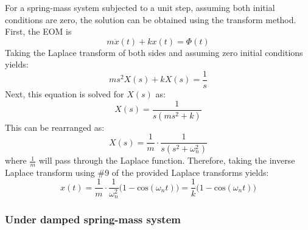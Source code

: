 \documentclass[12pt,letter]{article}
\numberwithin{ex}{section} %
\numberwithin{re}{section} %
\begin{document}
For a spring-mass system subjected to a unit step, assuming both initial conditions are zero, the solution can be obtained using the transform method. First, the EOM is 
\begin{equation}
m\ddot{x}(t) + kx(t) = \Phi(t)
\end{equation}
Taking the Laplace transform of both sides and assuming zero initial conditions yields:
\begin{equation}
	ms^2X(s)+kX(s) =\frac{1}{s}
\end{equation}
Next, this equation is solved for $X(s)$ as:
\begin{equation}
	X(s) = \frac{1}{s(ms^2+k)}
\end{equation}
This can be rearranged as:
\begin{equation}
	X(s) = \frac{1}{m} \cdot \frac{1}{s(s^2+\omega_n^2)}
\end{equation}
where $\frac{1}{m}$ will pass through the Laplace function. Therefore, taking the inverse Laplace transform using \#9 of the provided Laplace transforms yields:
\begin{equation}
	x(t) = \frac{1}{m} \cdot \frac{1}{\omega_n^2}\big(1-\text{cos}(\omega_n t)\big) = \frac{1}{k}\big(1-\text{cos}(\omega_n t)\big)
\end{equation}
 
\subsubsection{Under damped spring-mass system}
\end{document}
